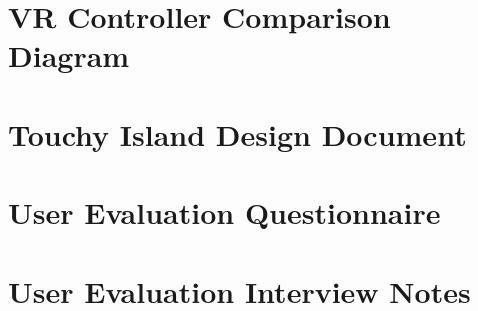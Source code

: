 \documentclass[12pt, a4paper]{report}
\begin{document}
\restoregeometry
\newpage


\begin{appendices}



\begingroup%
\makeatletter%
\cleardoublepage%
\let\newpage\relax%
\let\clearpage\relax%
\vspace*{\fill}%
\vspace*{\dimexpr-50\p@-\baselineskip}%
\chapter{VR Controller Comparison Diagram}
\label{apx:vrControllerComparison}
\vspace*{\fill}%
\endgroup%
\newpage



\begingroup%
\makeatletter%
\cleardoublepage%
\let\newpage\relax%
\let\clearpage\relax%
\vspace*{\fill}%
\vspace*{\dimexpr-50\p@-\baselineskip}%
\chapter{Touchy Island Design Document}
\label{apx:touchyIslandDesignDocument}
\vspace*{\fill}%
\endgroup%


\begingroup%
\makeatletter%
\cleardoublepage%
\let\newpage\relax%
\let\clearpage\relax%
\vspace*{\fill}%
\vspace*{\dimexpr-50\p@-\baselineskip}%
\chapter{User Evaluation Questionnaire}
\label{apx:questionnaire}
\vspace*{\fill}%
\endgroup%


\begingroup%
\makeatletter%
\cleardoublepage%
\let\newpage\relax%
\let\clearpage\relax%
\vspace*{\fill}%
\vspace*{\dimexpr-50\p@-\baselineskip}%
\chapter{User Evaluation Interview Notes}
\label{apx:interviewNotes}
\vspace*{\fill}%
\endgroup%


\end{appendices}
\end{document}
